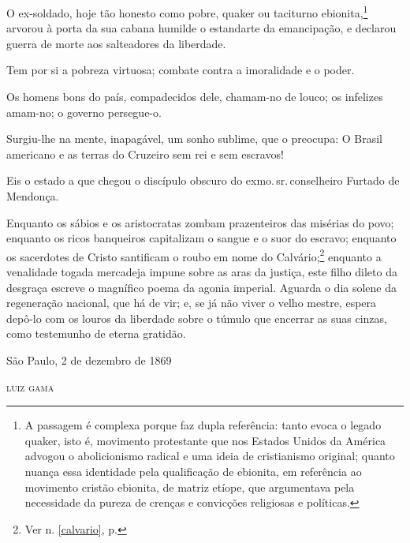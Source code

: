 O ex-soldado, hoje tão honesto como pobre, quaker ou taciturno
ebionita,\footnote{A passagem é complexa porque faz dupla referência:
  tanto evoca o legado quaker, isto é, movimento protestante que nos
  Estados Unidos da América advogou o abolicionismo radical e uma ideia
  de cristianismo original; quanto nuança essa identidade pela
  qualificação de ebionita, em referência ao movimento cristão ebionita,
  de matriz etíope, que argumentava pela necessidade da pureza de
  crenças e convicções religiosas e políticas.} arvorou à porta da sua
cabana humilde o estandarte da emancipação, e declarou guerra de morte
aos salteadores da liberdade.

Tem por si a pobreza virtuosa; combate contra a imoralidade e o poder.

Os homens bons do país, compadecidos dele, chamam-no de louco; os
infelizes amam-no; o governo persegue-o.

Surgiu-lhe na mente, inapagável, um sonho sublime, que o preocupa: O
Brasil americano e as terras do Cruzeiro sem rei e sem escravos!

Eis o estado a que chegou o discípulo obscuro do exmo.\,sr.\,conselheiro
Furtado de Mendonça.

Enquanto os sábios e os aristocratas zombam prazenteiros das misérias do
povo; enquanto os ricos banqueiros capitalizam o sangue e o suor do
escravo; enquanto os sacerdotes de Cristo santificam o roubo em nome do
Calvário;\footnote{Ver n. \ref{calvario}, p. \pageref{calvario}} enquanto 
a venalidade togada mercadeja impune sobre as aras da justiça, este filho 
dileto da desgraça escreve o magnífico poema da agonia imperial. Aguarda 
o dia solene da regeneração nacional, que há de vir; e, se já não viver o 
velho mestre, espera depô-lo com os louros da liberdade sobre o túmulo que 
encerrar as suas cinzas, como testemunho de eterna gratidão.

\begin{flushright}
São Paulo, 2 de dezembro de 1869

\textsc{luiz gama}
\end{flushright}

